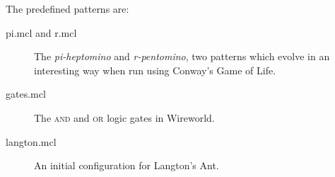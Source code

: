 \documentclass[oneside,a4paper]{memoir}
\begin{document}
The predefined patterns are:

\begin{description}
\item[pi.mcl \textnormal{and} r.mcl] The \emph{pi-heptomino} and \emph{r-pentomino}, two patterns which evolve in an interesting way when run using Conway's Game of Life.
\item[gates.mcl] The \textsc{and} and \textsc{or} logic gates in Wireworld.
\item[langton.mcl] An initial configuration for Langton's Ant.
\end{description}
\end{document}
